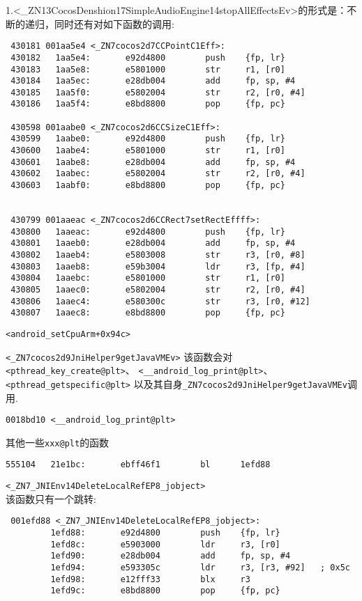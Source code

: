 1.<\_ZN13CocosDenshion17SimpleAudioEngine14stopAllEffectsEv>的形式是：不断的递归，同时还有对如下函数的调用:
\begin{lstlisting}
 430181 001aa5e4 <_ZN7cocos2d7CCPointC1Eff>:
 430182   1aa5e4:       e92d4800        push    {fp, lr}
 430183   1aa5e8:       e5801000        str     r1, [r0]
 430184   1aa5ec:       e28db004        add     fp, sp, #4
 430185   1aa5f0:       e5802004        str     r2, [r0, #4]
 430186   1aa5f4:       e8bd8800        pop     {fp, pc}

 430598 001aabe0 <_ZN7cocos2d6CCSizeC1Eff>:
 430599   1aabe0:       e92d4800        push    {fp, lr}
 430600   1aabe4:       e5801000        str     r1, [r0]
 430601   1aabe8:       e28db004        add     fp, sp, #4
 430602   1aabec:       e5802004        str     r2, [r0, #4]
 430603   1aabf0:       e8bd8800        pop     {fp, pc}


 430799 001aaeac <_ZN7cocos2d6CCRect7setRectEffff>:
 430800   1aaeac:       e92d4800        push    {fp, lr}
 430801   1aaeb0:       e28db004        add     fp, sp, #4
 430802   1aaeb4:       e5803008        str     r3, [r0, #8]
 430803   1aaeb8:       e59b3004        ldr     r3, [fp, #4]
 430804   1aaebc:       e5801000        str     r1, [r0]
 430805   1aaec0:       e5802004        str     r2, [r0, #4]
 430806   1aaec4:       e580300c        str     r3, [r0, #12]
 430807   1aaec8:       e8bd8800        pop     {fp, pc}
\end{lstlisting}

\verb|<android_setCpuArm+0x94c>|  

\verb|<_ZN7cocos2d9JniHelper9getJavaVMEv>| 
该函数会对\verb|<pthread_key_create@plt>|、
\verb|<__android_log_print@plt>|、
\verb|<pthread_getspecific@plt>|
以及其自身\verb|_ZN7cocos2d9JniHelper9getJavaVMEv|调用.

\verb|0018bd10 <__android_log_print@plt>|

其他一些\verb|xxx@plt|的函数

\verb|555104   21e1bc:       ebff46f1        bl      1efd88|
 
\verb|<_ZN7_JNIEnv14DeleteLocalRefEP8_jobject>|\\

该函数只有一个跳转:\\
\begin{lstlisting}
 001efd88 <_ZN7_JNIEnv14DeleteLocalRefEP8_jobject>:
         1efd88:       e92d4800        push    {fp, lr}
         1efd8c:       e5903000        ldr     r3, [r0]
         1efd90:       e28db004        add     fp, sp, #4
         1efd94:       e593305c        ldr     r3, [r3, #92]   ; 0x5c
         1efd98:       e12fff33        blx     r3
         1efd9c:       e8bd8800        pop     {fp, pc}
\end{lstlisting}

